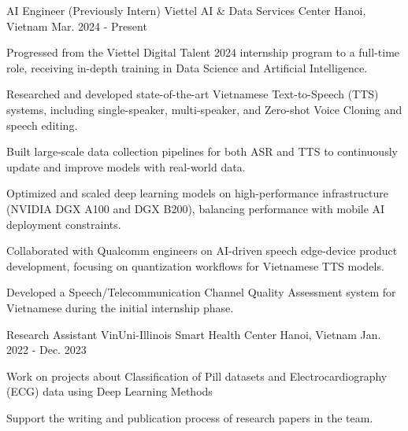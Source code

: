 

\begin{cventries}

\cventry
    {AI Engineer (Previously Intern)} %
    {Viettel AI \& Data Services Center} %
    {Hanoi, Vietnam} %
    {Mar. 2024 - Present} %
    {
      \begin{cvitems} %
        \item {Progressed from the Viettel Digital Talent 2024 internship program to a full-time role, receiving in-depth training in Data Science and Artificial Intelligence.}
        \item {Researched and developed state-of-the-art Vietnamese Text-to-Speech (TTS) systems, including single-speaker, multi-speaker, and Zero-shot Voice Cloning and speech editing.}
        \item {Built large-scale data collection pipelines for both ASR and TTS to continuously update and improve models with real-world data.}
        \item {Optimized and scaled deep learning models on high-performance infrastructure (NVIDIA DGX A100 and DGX B200), balancing performance with mobile AI deployment constraints.}
        \item {Collaborated with Qualcomm engineers on AI-driven speech edge-device product development, focusing on quantization workflows for Vietnamese TTS models.}
        \item {Developed a Speech/Telecommunication Channel Quality Assessment system for Vietnamese during the initial internship phase.}
      \end{cvitems}
    }
  \cventry
    {Research Assistant} %
    {VinUni-Illinois Smart Health Center} %
    {Hanoi, Vietnam} %
    {Jan. 2022 -  Dec. 2023} %
    {
      \begin{cvitems} %
        \item {Work on projects about Classification of Pill datasets and Electrocardiography (ECG) data using Deep Learning Methods}
        \item {Support the writing and publication process of research papers in the team.}
      \end{cvitems}
    }


\end{cventries}
